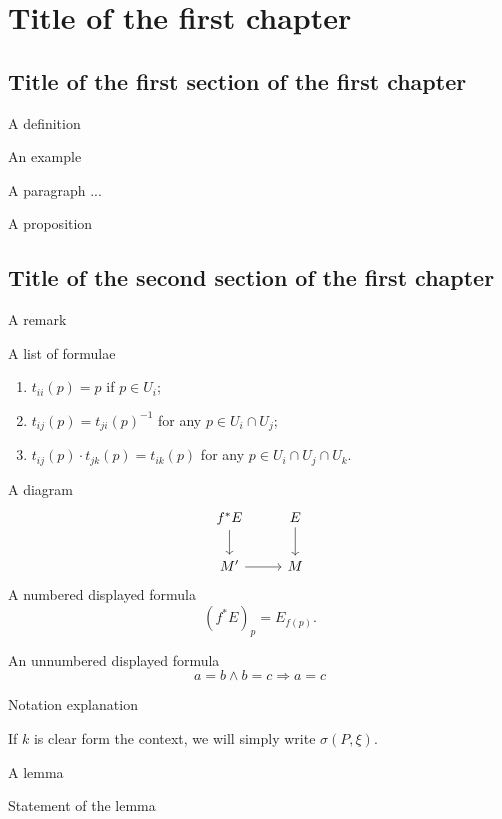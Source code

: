 \chapter{Title of the first chapter}
\label{chap:1}

\section{Title of the first section of the first chapter}
\label{sec:11}
\begin{defn}
    A definition
\end{defn}


\begin{ex}
    An example
\end{ex}


A paragraph ...

\begin{prop}
\label{corr:3}

A proposition

\end{prop}



\section{Title of the second section of the first chapter}
\label{sec:12}
\begin{rmk}
A remark
\end{rmk}

\noindent
A list of formulae

\begin{enumerate}
    \item $t_{ii}(p)=p$ if $p \in U_i$;
    \item $t_{ij}(p) = t_{ji}(p)^{-1}$ for any $p \in  U_i \cap U_j$;
    \item $t_{ij}(p)\cdot t_{jk}(p) = t_{ik}(p)$ for any $p\in U_i \cap U_j \cap U_k$.
\end{enumerate}
A diagram
\[
\begin{tikzcd}
    f^*E \arrow{d}{} & E \arrow{d}{}\\
    M' \arrow{r}{} & M
\end{tikzcd}
\]
A numbered displayed formula
\begin{equation}
\label{ps:2}
    (f^*E)_p= E_{f(p)}.
\end{equation}

An unnumbered displayed formula
\[
	a=b \wedge b=c \Rightarrow a=c
\]

Notation explanation
\begin{notn}
If $k$ is clear form the context, we will simply write $\sigma(P,\xi)$.
\end{notn}

A lemma

\begin{lem}
\label{corr:15}
Statement of the lemma
\end{lem}
